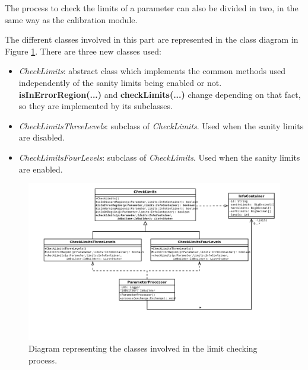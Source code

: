 The process to check the limits of a parameter can also be divided in two, in the same way as the calibration module.

The different classes involved in this  part are represented in the class diagram in Figure \ref{f5.10}. There are three new classes used:

\begin{itemize}
	\item \emph{CheckLimits}: abstract class which implements the common methods used independently of the sanity limits being enabled or not. \textbf{isInErrorRegion(...)} and \textbf{checkLimits(...)} change depending on that fact, so they are implemented by its subclasses.
	\item \emph{CheckLimitsThreeLevels}: subclass of \emph{CheckLimits}. Used when the sanity limits are disabled.
	\item \emph{CheckLimitsFourLevels}: subclass of \emph{CheckLimits}. Used when the sanity limits are enabled. 
\end{itemize}


\begin{figure}[H]
\centerline{\includegraphics[width=1\textwidth]{images/CheckLimitsClassDiagram.png}}
\caption{Diagram representing the classes involved in the limit checking process.}
\label{f5.10}
\end{figure}

